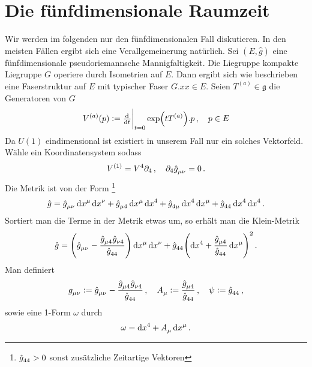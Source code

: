 \section{Die fünfdimensionale Raumzeit}
Wir werden im folgenden nur den fünfdimensionalen Fall diskutieren. In den
meisten Fällen ergibt sich eine Verallgemeinerung natürlich. Sei $(E,\hat{g})$
eine fünfdimensionale pseudoriemannsche Mannigfaltigkeit. Die Liegruppe
kompakte Liegruppe $G$ operiere durch Isometrien auf $E$. 
Dann ergibt sich wie beschrieben eine Faserstruktur auf $E$ mit typischer Faser
$G.x x\in E$. Seien $T^{(a)}\in \mathfrak{g}$ die Generatoren von $G$
\begin{equation}
V^{(a)}(p):=\od{}{t}\bigg|_{t=0}\exp\left(tT^{(a)}\right).p\,,\quad p\in E
\end{equation}
Da $U(1)$ eindimensional ist existiert in unserem Fall nur ein solches
Vektorfeld. Wähle ein Koordinatensystem sodass 
\begin{equation}
V^{(1)}=V^4\partial_4\,,\quad \partial_4\tensor{\hat{g}}{_\mu_\nu}=0\,.
\end{equation}
Die Metrik ist von der Form \footnote{$\tensor{\hat{g}}{_4_4}>0$ sonst
zusätzliche Zeitartige Vektoren}
\begin{equation}
\hat{g}=\tensor{\hat{g}}{_\mu_\nu}\dif\tensor{x}{^\mu}\dif\tensor{x}{^\nu}
+\tensor{\hat{g}}{_\mu_4}\dif\tensor{x}{^\mu}\dif\tensor{x}{^4}
+\tensor{\hat{g}}{_4_\mu}\dif\tensor{x}{^4}\dif\tensor{x}{^\mu}
+\tensor{\hat{g}}{_4_4}\dif\tensor{x}{^4}\dif\tensor{x}{^4}\,.
\end{equation}
Sortiert man die Terme in der Metrik etwas um, so erhält man die Klein-Metrik
\begin{equation}
\hat{g}=\left(\tensor{\hat{g}}{_\mu_\nu}-\frac{\tensor{\hat{g}}{_\mu_4}\tensor{\hat{g}}{_\nu_4}}{\tensor{\hat{g}}{_4_4}}\right)\dif\tensor{x}{^\mu}\dif\tensor{x}{^\nu}
+\tensor{\hat{g}}{_4_4}\left(\dif\tensor{x}{^4}+\frac{\tensor{\hat{g}}{_\mu_4}}{\tensor{\hat{g}}{_4_4}}\dif\tensor{x}{^\mu}\right)^2
\,.
\end{equation}
Man definiert 
\begin{equation}
\tensor{g}{_\mu_\nu}:=\tensor{\hat{g}}{_\mu_\nu}-\frac{\tensor{\hat{g}}{_\mu_4}\tensor{\hat{g}}{_\nu_4}}{\tensor{\hat{g}}{_4_4}}
\,,\quad
\tensor{A}{_\mu}:=\frac{\tensor{\hat{g}}{_\mu_4}}{\tensor{\hat{g}}{_4_4}}
\,,\quad
\psi:=\tensor{\hat{g}}{_4_4}\,,
\end{equation}
sowie eine 1-Form $\omega$ durch
\begin{equation}
\omega=\dif\tensor{x}{^4}+\tensor{A}{_\mu}\dif\tensor{x}{^\mu}\,.
\end{equation}
